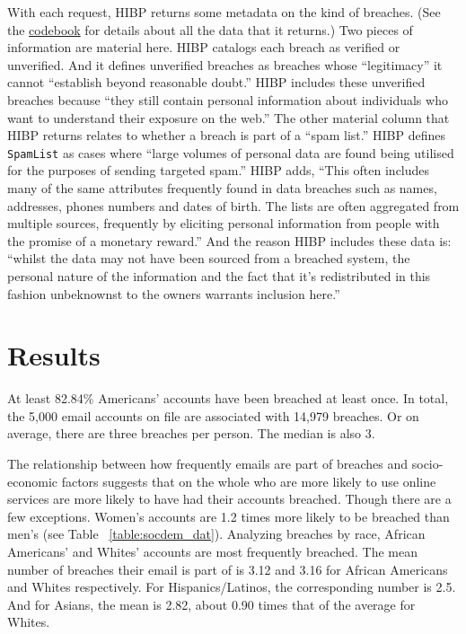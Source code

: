 \documentclass[12pt, letterpaper]{article}
\begin{document}
With each request, HIBP returns some metadata on the kind of breaches. (See the \href{https://github.com/themains/pwned/blob/master/data/hipb\_codebook.xlsx}{codebook} for details about all the data that it returns.) Two pieces of information are material here. HIBP catalogs each breach as verified or unverified. And it defines unverified breaches as breaches whose ``legitimacy'' it cannot ``establish beyond reasonable doubt.'' HIBP includes these unverified breaches because ``they still contain personal information about individuals who want to understand their exposure on the web.'' The other material column that HIBP returns relates to whether a breach is part of a ``spam list.'' HIBP defines \texttt{SpamList} as cases where ``large volumes of personal data are found being utilised for the purposes of sending targeted spam.'' HIBP adds, ``This often includes many of the same attributes frequently found in data breaches such as names, addresses, phones numbers and dates of birth. The lists are often aggregated from multiple sources, frequently by eliciting personal information from people with the promise of a monetary reward.'' And the reason HIBP includes these data is: ``whilst the data may not have been sourced from a breached system, the personal nature of the information and the fact that it's redistributed in this fashion unbeknownst to the owners warrants inclusion here.''

\section*{Results}
At least 82.84\% Americans' accounts have been breached at least once. In total, the 5,000 email accounts on file are associated with 14,979 breaches. Or on average, there are three breaches per person. The median is also 3.

The relationship between how frequently emails are part of breaches and socio-economic factors suggests that on the whole who are more likely to use online services are more likely to have had their accounts breached. Though there are a few exceptions. 
Women's accounts are 1.2 times more likely to be breached than men's (see Table ~\ref{table:socdem_dat}). Analyzing breaches by race, African Americans' and Whites' accounts are most frequently breached. The mean number of breaches their email is part of is 3.12 and 3.16 for African Americans and Whites respectively. For Hispanics/Latinos, the corresponding number is 2.5. And for Asians, the mean is 2.82, about 0.90 times that of the average for Whites.
\end{document}
